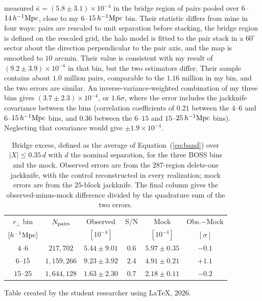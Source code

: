 \documentclass[11pt,letterpaper]{article}
\newcommand{\hinvMpc}{h^{-1}{\rm Mpc}}
\begin{document}
\citet{deGraaff2019} measured
$\bar\kappa=(5.8\pm3.1)\times10^{-4}$ in the bridge region of pairs pooled
over $6$--$14\,\hinvMpc$, close to my $6$--$15\,\hinvMpc$ bin. Their statistic differs from mine in four ways:
pairs are rescaled to unit separation before stacking, the bridge region is
defined on the rescaled grid, the halo model is fitted to the pair stack in
a $60^\circ$ sector about the direction perpendicular to the pair axis, and
the map is smoothed to $10$ arcmin. Their value is consistent with my
result of $(9.2\pm3.9)\times10^{-4}$ in that bin, but the two estimators
differ. Their sample contains about $1.0$ million pairs, comparable to the
$1.16$ million in my bin, and the two errors are similar.
An inverse-variance-weighted combination of my three bins gives
$(3.7\pm2.3)\times10^{-4}$, or $1.6\sigma$, where the error includes the
jackknife covariance between the bins (correlation coefficients of $0.21$
between the $4$--$6$ and $6$--$15\,\hinvMpc$ bins, and $0.36$ between the
$6$--$15$ and $15$--$25\,\hinvMpc$ bins). Neglecting that covariance would
give $\pm1.9\times10^{-4}$.

\begin{table}
  \centering
  \caption{Bridge excess, defined as the average of Equation~(\ref{eq:band})
  over $|X|\leq0.35\,d$ with $d$ the nominal separation, for the three
  BOSS bins and the mock. Observed
  errors are from the $287$-region delete-one jackknife, with the control
  reconstructed in every realization; mock errors are from the $25$-block
  jackknife. The final column gives the observed-minus-mock difference divided
  by the quadrature sum of the two errors.}
  \label{tab:bridge}
  \begin{tabular}{cccccc}
    \hline
    $r_{\perp}$ bin & $N_{\rm pairs}$ & Observed & S/N & Mock & Obs.$-$Mock \\
    $[\hinvMpc]$ & & $[10^{-4}]$ & & $[10^{-4}]$ & $[\sigma]$ \\
    \hline
    $4$--$6$   & $217{,}702$     & $5.44\pm9.01$ & $0.6$ & $5.97\pm0.35$ & $-0.1$ \\
    $6$--$15$  & $1{,}159{,}266$ & $9.23\pm3.92$ & $2.4$ & $4.91\pm0.21$ & $+1.1$ \\
    $15$--$25$ & $1{,}644{,}128$ & $1.63\pm2.30$ & $0.7$ & $2.18\pm0.11$ & $-0.2$ \\
    \hline
  \end{tabular}

  \smallskip
  {\small Table created by the student researcher using \LaTeX, 2026.}
\end{table}
\end{document}
